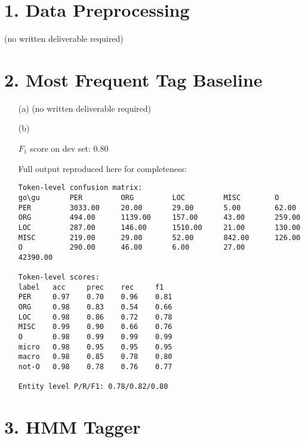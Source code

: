 \documentclass{article}
\begin{document}
\section*{1. Data Preprocessing}

(no written deliverable required)

\section*{2. Most Frequent Tag Baseline}

\begin{itemize}
    \item[(a)] (no written deliverable required)
    \item[(b)] 

$F_1$ score on dev set: 0.80

Full output reproduced here for completeness:

\begin{verbatim}
Token-level confusion matrix:
go\gu   	PER     	ORG     	LOC     	MISC    	O       
PER     	3033.00 	20.00   	29.00   	5.00    	62.00   
ORG     	494.00  	1139.00 	157.00  	43.00   	259.00  
LOC     	287.00  	146.00  	1510.00 	21.00   	130.00  
MISC    	219.00  	29.00   	52.00   	842.00  	126.00  
O       	290.00  	46.00   	6.00    	27.00   	42390.00

Token-level scores:
label	acc  	prec 	rec  	f1   
PER  	0.97 	0.70 	0.96 	0.81 
ORG  	0.98 	0.83 	0.54 	0.66 
LOC  	0.98 	0.86 	0.72 	0.78 
MISC 	0.99 	0.90 	0.66 	0.76 
O    	0.98 	0.99 	0.99 	0.99 
micro	0.98 	0.95 	0.95 	0.95 
macro	0.98 	0.85 	0.78 	0.80 
not-O	0.98 	0.78 	0.76 	0.77 

Entity level P/R/F1: 0.78/0.82/0.80
\end{verbatim}

\end{itemize}

\section*{3. HMM Tagger}
\end{document}
